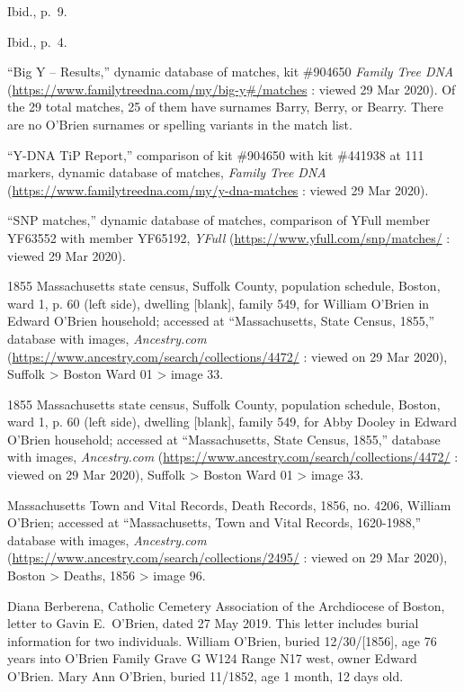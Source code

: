 \begin{thebibliography}{999}
	Ibid., p.\ 9.
	
	Ibid., p.\ 4.
	
	``Big Y -- Results,'' dynamic database of matches, kit \#904650 \textit{Family Tree DNA} (\url{https://www.familytreedna.com/my/big-y#/matches} : viewed 29 Mar 2020). Of the 29 total matches, 25 of them have surnames Barry, Berry, or Bearry. There are no O'Brien surnames or spelling variants in the match list.
	
	``Y-DNA TiP Report,'' comparison of kit \#904650 with kit \#441938 at 111 markers, dynamic database of matches, \textit{Family Tree DNA} (\url{https://www.familytreedna.com/my/y-dna-matches} : viewed 29 Mar 2020).
	
	``SNP matches,'' dynamic database of matches, comparison of YFull member YF63552 with member YF65192, \textit{YFull} (\url{https://www.yfull.com/snp/matches/} : viewed 29 Mar 2020).
	
	1855 Massachusetts state census, Suffolk County, population schedule, Boston, ward 1, p. 60 (left side), dwelling [blank], family 549, for William O'Brien in Edward O'Brien household; accessed at ``Massachusetts, State Census, 1855,'' database with images, \textit{Ancestry.com} (\url{https://www.ancestry.com/search/collections/4472/} : viewed on 29 Mar 2020), Suffolk > Boston Ward 01 > image 33.
	
	1855 Massachusetts state census, Suffolk County, population schedule, Boston, ward 1, p. 60 (left side), dwelling [blank], family 549, for Abby Dooley in Edward O'Brien household; accessed at ``Massachusetts, State Census, 1855,'' database with images, \textit{Ancestry.com} (\url{https://www.ancestry.com/search/collections/4472/} : viewed on 29 Mar 2020), Suffolk > Boston Ward 01 > image 33.
		
	Massachusetts Town and Vital Records, Death Records, 1856, no. 4206, William O'Brien; accessed at ``Massachusetts, Town and Vital Records, 1620-1988,'' database with images, \textit{Ancestry.com} (\url{https://www.ancestry.com/search/collections/2495/} : viewed on 29 Mar 2020), Boston > Deaths, 1856 > image 96.
		
	Diana Berberena, Catholic Cemetery Association of the Archdiocese of Boston, letter to Gavin E.\ O'Brien, dated 27 May 2019. This letter includes burial information for two individuals. William O'Brien, buried 12/30/[1856], age 76 years into O'Brien Family Grave G W124 Range N17 west, owner Edward O'Brien. Mary Ann O'Brien, buried 11/1852, age 1 month, 12 days old.
	

\end{thebibliography}
